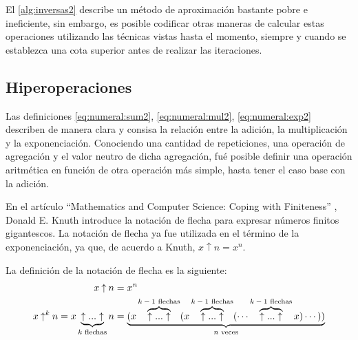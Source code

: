 El \autoref{alg:inversas2} describe un método de aproximación bastante pobre e ineficiente, sin embargo, es posible codificar otras maneras de calcular estas operaciones utilizando las técnicas vistas hasta el momento, siempre y cuando se establezca una cota superior antes de realizar las iteraciones.

\subsection{Hiperoperaciones}
\label{sec:hiperoperaciones}

Las definiciones \eqref{eq:numeral:sum2}, \eqref{eq:numeral:mul2}, \eqref{eq:numeral:exp2} describen de manera clara y consisa la relación entre la adición, la multiplicación y la exponenciación. Conociendo una cantidad de repeticiones, una operación de agregación y el valor neutro de dicha agregación, fué posible definir una operación aritmética en función de otra operación más simple, hasta tener el caso base con la adición.

En el artículo ``Mathematics and Computer Science: Coping with Finiteness'' \cite{Knuth:Arrow}, Donald E. Knuth introduce la notación de flecha para expresar números finitos gigantescos. La notación de flecha ya fue utilizada en el término de la exponenciación, ya que, de acuerdo a Knuth, $ x \mathbin{\uparrow} n = x^{n} $.

La definición de la notación de flecha es la siguiente:
\begin{align*}
  x \mathbin{\uparrow} n &= x^{n} \\
  x \mathbin{\uparrow^{k}} n = x \underbrace{\uparrow ... \uparrow}_\text{$ k $ flechas} n &= \underbrace{(x \overbrace{\uparrow ... \uparrow}^\text{$ k-1 $ flechas} (x \overbrace{\uparrow ... \uparrow}^\text{$ k-1 $ flechas} (\cdots \overbrace{\uparrow ... \uparrow}^\text{$ k-1 $ flechas} x) \cdots))}_\text{$ n $ veces}
\end{align*}

